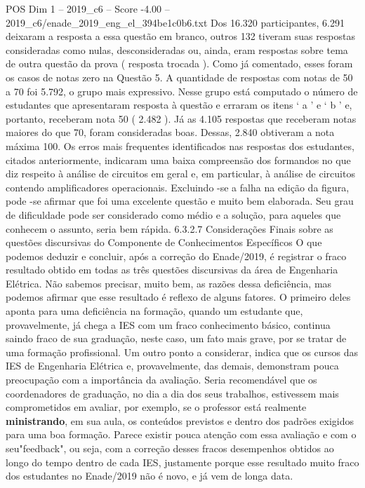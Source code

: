 \begin{textsample}{POS Dim 1 – 2019\_c6 – Score -4.00 – 2019\_c6/enade\_2019\_eng\_el\_394be1c0b6.txt}
Dos 16.320 participantes, 6.291 deixaram a resposta a essa questão em branco, outros 132 tiveram suas respostas consideradas como nulas, desconsideradas ou, ainda, eram respostas sobre tema de outra questão da prova ( resposta trocada ).
Como já comentado, esses foram os casos de notas zero na Questão 5.
A quantidade de respostas com notas de 50 a 70 foi 5.792, o grupo mais expressivo.
Nesse grupo está computado o número de estudantes que apresentaram resposta à questão e erraram os itens ‘ a ’ e ‘ b ’ e, portanto, receberam nota 50 ( 2.482 ).
Já as 4.105 respostas que receberam notas maiores do que 70, foram consideradas boas.
Dessas, 2.840 obtiveram a nota máxima 100.
Os erros mais frequentes identificados nas respostas dos estudantes, citados anteriormente, indicaram uma baixa compreensão dos formandos no que diz respeito à análise de circuitos em geral e, em particular, à análise de circuitos contendo amplificadores operacionais.
Excluindo -se a falha na edição da figura, pode -se afirmar que foi uma excelente questão e muito bem elaborada.
Seu grau de dificuldade pode ser considerado como médio e a solução, para aqueles que conhecem o assunto, seria bem rápida. 6.3.2.7 Considerações Finais sobre as questões discursivas do Componente de Conhecimentos Específicos O que podemos deduzir e concluir, após a correção do Enade/2019, é registrar o fraco resultado obtido em todas as três questões discursivas da área de Engenharia Elétrica.
Não sabemos precisar, muito bem, as razões dessa deficiência, mas podemos afirmar que esse resultado é reflexo de alguns fatores.
O primeiro deles aponta para uma deficiência na formação, quando um estudante que, provavelmente, já chega a IES com um fraco conhecimento básico, continua saindo fraco de sua graduação, neste caso, um fato mais grave, por se tratar de uma formação profissional.
Um outro ponto a considerar, indica que os cursos das IES de Engenharia Elétrica e, provavelmente, das demais, demonstram pouca preocupação com a importância da avaliação.
Seria recomendável que os coordenadores de graduação, no dia a dia dos seus trabalhos, estivessem mais comprometidos em avaliar, por exemplo, se o professor está realmente \textbf{ministrando}, em sua aula, os conteúdos previstos e dentro dos padrões exigidos para uma boa formação.
Parece existir pouca atenção com essa avaliação e com o seu"feedback", ou seja, com a correção desses fracos desempenhos obtidos ao longo do tempo dentro de cada IES, justamente porque esse resultado muito fraco dos estudantes no Enade/2019 não é novo, e já vem de longa data.

\end{textsample}
